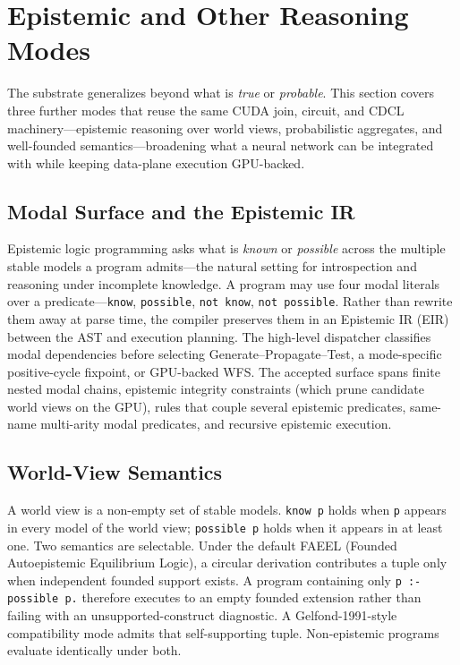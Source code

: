 \section{Epistemic and Other Reasoning Modes}\label{sec:epistemic}

The substrate generalizes beyond what is \emph{true} or \emph{probable}. This section covers three further modes that reuse the same CUDA join, circuit, and CDCL machinery---epistemic reasoning over world views, probabilistic aggregates, and well-founded semantics---broadening what a neural network can be integrated with while keeping data-plane execution GPU-backed.

\subsection{Modal Surface and the Epistemic IR}

Epistemic logic programming asks what is \emph{known} or \emph{possible} across the multiple stable models a program admits---the natural setting for introspection and reasoning under incomplete knowledge. A program may use four modal literals over a predicate---\texttt{know}, \texttt{possible}, \texttt{not know}, \texttt{not possible}. Rather than rewrite them away at parse time, the compiler preserves them in an Epistemic IR (EIR) between the AST and execution planning. The high-level dispatcher classifies modal dependencies before selecting Generate--Propagate--Test, a mode-specific positive-cycle fixpoint, or GPU-backed WFS. The accepted surface spans finite nested modal chains, epistemic integrity constraints (which prune candidate world views on the GPU), rules that couple several epistemic predicates, same-name multi-arity modal predicates, and recursive epistemic execution.

\subsection{World-View Semantics}

A world view is a non-empty set of stable models. \texttt{know p} holds when \texttt{p} appears in every model of the world view; \texttt{possible p} holds when it appears in at least one. Two semantics are selectable. Under the default FAEEL (Founded Autoepistemic Equilibrium Logic), a circular derivation contributes a tuple only when independent founded support exists. A program containing only \texttt{p :- possible p.} therefore executes to an empty founded extension rather than failing with an unsupported-construct diagnostic. A Gelfond-1991-style compatibility mode admits that self-supporting tuple. Non-epistemic programs evaluate identically under both.

